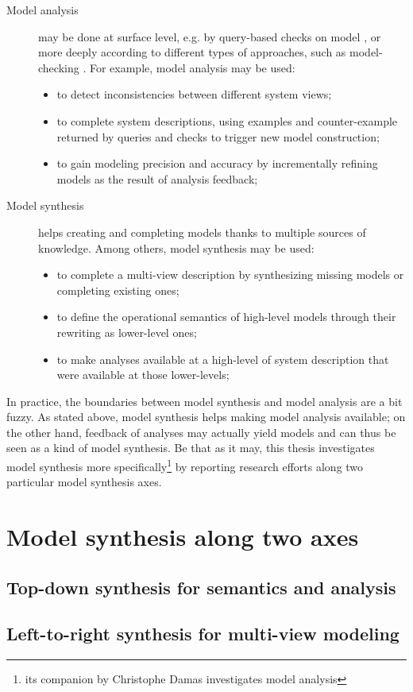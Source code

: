 \begin{description}

\item[Model analysis] may be done at surface level, e.g. by query-based checks on model \cite{VanLamsweerde:2009}, or more deeply according to different types of approaches, such as model-checking \cite{Clarke:1986, Queille:1982}. For example, model analysis may be used:

\begin{itemize}
\item to detect inconsistencies between different system views;
\item to complete system descriptions, using examples and counter-example returned by queries and checks to trigger new model construction;
\item to gain modeling precision and accuracy by incrementally refining models as the result of analysis feedback;
\end{itemize}

\item[Model synthesis] helps creating and completing models thanks to multiple sources of knowledge. Among others, model synthesis may be used:

\begin{itemize}
\item to complete a multi-view description by synthesizing missing models or completing existing ones;
\item to define the operational semantics of high-level models through their rewriting as lower-level ones;
\item to make analyses available at a high-level of system description that were available at those lower-levels;
\end{itemize}

\end{description}

In practice, the boundaries between model synthesis and model analysis are a bit fuzzy. As stated above, model synthesis helps making model analysis available; on the other hand, feedback of analyses may actually yield models and can thus be seen as a kind of model synthesis. Be that as it may, this thesis investigates model synthesis more specifically\footnote{its companion by Christophe Damas \cite{Damas:2011} investigates model analysis} by reporting research efforts along two particular model synthesis axes.

\section{Model synthesis along two axes}

\subsection{Top-down synthesis for semantics and analysis}

\subsection{Left-to-right synthesis for multi-view modeling} 





